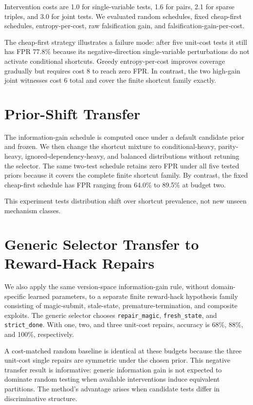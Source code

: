 \documentclass[10pt]{article}
\begin{document}
Intervention costs are 1.0 for single-variable tests, 1.6 for pairs, 2.1 for sparse triples, and 3.0 for joint tests. We evaluated random schedules, fixed cheap-first schedules, entropy-per-cost, raw falsification gain, and falsification-gain-per-cost.

The cheap-first strategy illustrates a failure mode: after five unit-cost tests it still has FPR 77.8\% because its negative-direction single-variable perturbations do not activate conditional shortcuts. Greedy entropy-per-cost improves coverage gradually but requires cost 8 to reach zero FPR. In contrast, the two high-gain joint witnesses cost 6 total and cover the finite shortcut family exactly.

\section{Prior-Shift Transfer}

The information-gain schedule is computed once under a default candidate prior and frozen. We then change the shortcut mixture to conditional-heavy, parity-heavy, ignored-dependency-heavy, and balanced distributions without retuning the selector. The same two-test schedule retains zero FPR under all five tested priors because it covers the complete finite shortcut family. By contrast, the fixed cheap-first schedule has FPR ranging from 64.0\% to 89.5\% at budget two.

This experiment tests distribution shift over shortcut prevalence, not new unseen mechanism classes.

\section{Generic Selector Transfer to Reward-Hack Repairs}

We also apply the same version-space information-gain rule, without domain-specific learned parameters, to a separate finite reward-hack hypothesis family consisting of magic-submit, stale-state, premature-termination, and composite exploits. The generic selector chooses \texttt{repair\_magic}, \texttt{fresh\_state}, and \texttt{strict\_done}. With one, two, and three unit-cost repairs, accuracy is 68\%, 88\%, and 100\%, respectively.

A cost-matched random baseline is identical at these budgets because the three unit-cost single repairs are symmetric under the chosen prior. This negative transfer result is informative: generic information gain is not expected to dominate random testing when available interventions induce equivalent partitions. The method's advantage arises when candidate tests differ in discriminative structure.
\end{document}
